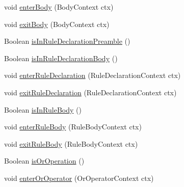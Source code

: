 \begin{DoxyCompactItemize}
\item 
void \hyperlink{classit_1_1emarolab_1_1cagg_1_1core_1_1language_1_1parser_1_1ANTLRInterface_1_1LogicalParserListener_ae0564f0dc58f8704b8dee56b7caac3ea}{enter\-Body} (Body\-Context ctx)
\item 
void \hyperlink{classit_1_1emarolab_1_1cagg_1_1core_1_1language_1_1parser_1_1ANTLRInterface_1_1LogicalParserListener_ac1660e12686fbe452aa6cff3fb7e30d2}{exit\-Body} (Body\-Context ctx)
\item 
Boolean \hyperlink{classit_1_1emarolab_1_1cagg_1_1core_1_1language_1_1parser_1_1ANTLRInterface_1_1LogicalParserListener_a7596106d5bd7590c7e941ed2445c9b7c}{is\-In\-Rule\-Declaration\-Preamble} ()
\item 
Boolean \hyperlink{classit_1_1emarolab_1_1cagg_1_1core_1_1language_1_1parser_1_1ANTLRInterface_1_1LogicalParserListener_a76ea4109b55989ae1c9b21ba1a4ba605}{is\-In\-Rule\-Declaration\-Body} ()
\item 
void \hyperlink{classit_1_1emarolab_1_1cagg_1_1core_1_1language_1_1parser_1_1ANTLRInterface_1_1LogicalParserListener_a2fab3cd21aefb1d5c46d0e7d6e8a5823}{enter\-Rule\-Declaration} (Rule\-Declaration\-Context ctx)
\item 
void \hyperlink{classit_1_1emarolab_1_1cagg_1_1core_1_1language_1_1parser_1_1ANTLRInterface_1_1LogicalParserListener_a5f03a5b07ffb03e5a41d18fca8860eb8}{exit\-Rule\-Declaration} (Rule\-Declaration\-Context ctx)
\item 
Boolean \hyperlink{classit_1_1emarolab_1_1cagg_1_1core_1_1language_1_1parser_1_1ANTLRInterface_1_1LogicalParserListener_a82126674de544ea02305a0fbfe9d95fb}{is\-In\-Rule\-Body} ()
\item 
void \hyperlink{classit_1_1emarolab_1_1cagg_1_1core_1_1language_1_1parser_1_1ANTLRInterface_1_1LogicalParserListener_a37f5287ab6f6514a385ce75cea3489a1}{enter\-Rule\-Body} (Rule\-Body\-Context ctx)
\item 
void \hyperlink{classit_1_1emarolab_1_1cagg_1_1core_1_1language_1_1parser_1_1ANTLRInterface_1_1LogicalParserListener_a52a1f661037cff763042155ebce79b2e}{exit\-Rule\-Body} (Rule\-Body\-Context ctx)
\item 
Boolean \hyperlink{classit_1_1emarolab_1_1cagg_1_1core_1_1language_1_1parser_1_1ANTLRInterface_1_1LogicalParserListener_ad2bec60e17e0918e1f4236e667888df6}{is\-Or\-Operation} ()
\item 
void \hyperlink{classit_1_1emarolab_1_1cagg_1_1core_1_1language_1_1parser_1_1ANTLRInterface_1_1LogicalParserListener_acb26240cfb40eeb149d7009e78740422}{enter\-Or\-Operator} (Or\-Operator\-Context ctx)

\end{DoxyCompactItemize}
